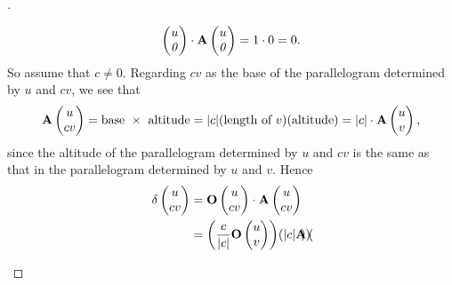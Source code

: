 \begin{proof}[]
\begin{enumerate}
\[\begin{pmatrix}
				      u \\
				      \mathit{0}
			      \end{pmatrix} \cdot \mathbf{A}\begin{pmatrix}
				      u \\
				      \mathit{0}
			      \end{pmatrix} = 1 \cdot 0 = 0.
		      \]
		      So assume that \(c \neq 0\).
		      Regarding \(cv\) as the base of the parallelogram determined by \(u\) and \(cv\), we see that
		      \[
			      \mathbf{A}\begin{pmatrix}
				      u \\
				      cv
			      \end{pmatrix} = \text{base } \times \text{ altitude} = \abs{c} (\text{length of } v) (\text{altitude}) = \abs{c} \cdot \mathbf{A}\begin{pmatrix}
				      u \\
				      v
			      \end{pmatrix},
		      \]
		      since the altitude of the parallelogram determined by \(u\) and \(cv\) is the same as that in the parallelogram determined by \(u\) and \(v\).
		      Hence
		      \begin{align*}
			      \delta\begin{pmatrix}
				            u \\
				            cv
			            \end{pmatrix} & = \mathbf{O}\begin{pmatrix}
				                                        u \\
				                                        cv
			                                        \end{pmatrix} \cdot \mathbf{A}\begin{pmatrix}
				                                                                      u \\
				                                                                      cv
			                                                                      \end{pmatrix}                                              \\
			                            & = \pa{\frac{c}{\abs{c}} \mathbf{O}\begin{pmatrix}
					                                                                u \\
					                                                                v
				                                                                \end{pmatrix}} \pa{\abs{c} \mathbf{A}\begin{pmatrix}

\end{pmatrix}}
\end{align*}
\end{enumerate}
\end{proof}
